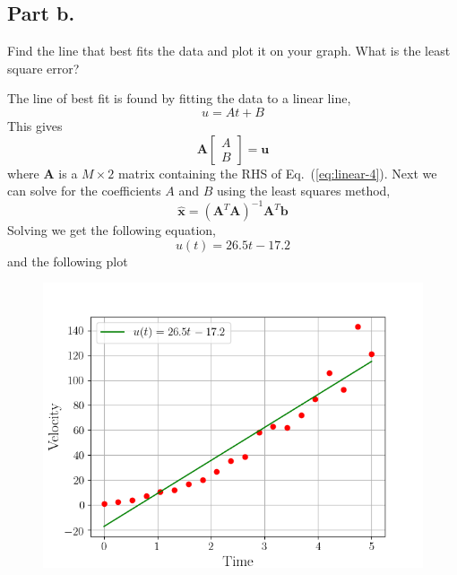 \subsection{Part b.}
Find the line that best fits the data and plot it on your graph. What is
the least square error?
\begin{mdframed}[style=MyFrame]
    The line of best fit is found by fitting the data to a linear line,
    \begin{equation}
        u = At + B
        \label{eq:linear-4}
    \end{equation}
    This gives
    \begin{equation}
        \mathbf{A}
        \begin{bmatrix}
            A   \\
            B
        \end{bmatrix}
        = \mathbf{u}
    \end{equation}
    where $\mathbf{A}$ is a $M \times 2$ matrix containing the RHS of
    Eq.~(\ref{eq:linear-4}). Next we can solve for the coefficients
    $A$ and $B$ using the least squares method,
    \begin{equation}
        \widehat{\mathbf{x}} = 
            \left(\mathbf{A}^{T} \mathbf{A}\right)^{-1} \mathbf{A}^{T}
            \mathbf{b}
    \end{equation}
    Solving we get the following equation,
    \begin{equation}
        u(t) = 26.5t - 17.2
    \end{equation}
    and the following plot
    \begin{figure}[H]
        \includegraphics[height=0.35\textheight]{media/linear.png}

\end{figure}
\end{mdframed}
